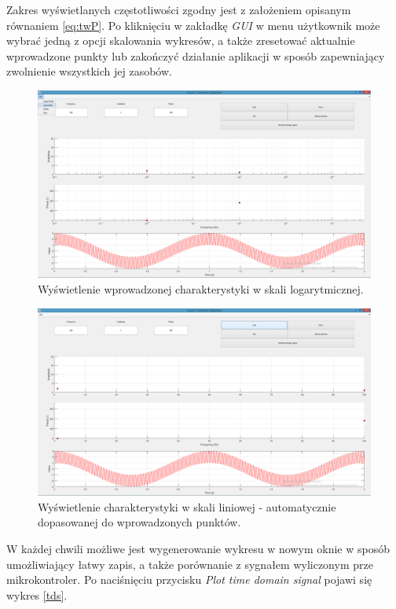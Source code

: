 Zakres wyświetlanych częstotliwości zgodny jest z założeniem opisanym równaniem \ref{eq:twP}. Po kliknięciu w zakładkę \textit{GUI} w menu użytkownik może wybrać jedną z opcji skalowania wykresów, a także zresetować aktualnie wprowadzone punkty lub zakończyć działanie aplikacji w sposób zapewniający zwolnienie wszystkich jej zasobów.
\begin{figure}[h!]
	\centering
	\includegraphics[scale = 0.3]{fig/ls.png}
	\caption		
	{Wyświetlenie wprowadzonej charakterystyki w skali logarytmicznej.}
	\label{log}
\end{figure}
\begin{figure}[h!]
	\centering
	\includegraphics[scale = 0.3]{fig/as.png}
	\caption		
	{Wyświetlenie charakterystyki w skali liniowej - automatycznie dopasowanej do wprowadzonych punktów.}
	\label{as}
\end{figure}
W każdej chwili możliwe jest wygenerowanie wykresu w nowym oknie w sposób umożliwiający łatwy zapis, a także porównanie z sygnałem wyliczonym prze mikrokontroler. Po naciśnięciu przycisku \textit{Plot time domain signal} pojawi się wykres \ref{tds}.
